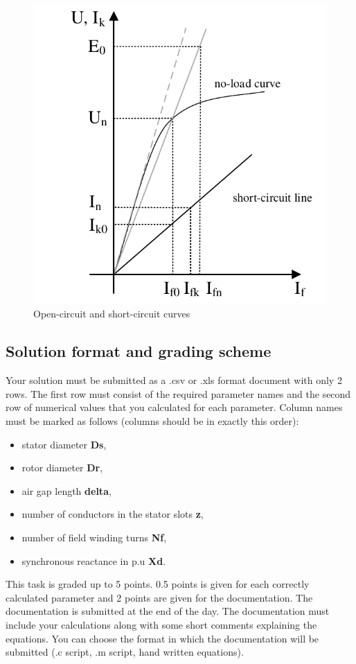 \documentclass[class=article, crop=false]{standalone}
\begin{document}
\begin{figure}[!htb]
			\centering
			\includegraphics[scale=0.5]{NoLoadCurveShortCircuit.pdf}
			\caption{Open-circuit and short-circuit curves}
			\label{fig:02}
\end{figure}

\subsection{Solution format and grading scheme}
Your solution must be submitted as a .csv or .xls format document with only 2 rows. The first row must consist of the required parameter names and the second row of numerical values that you calculated for each parameter. Column names must be marked as follows (columns should be in exactly this order):
\begin{itemize}
    \item stator diameter \textbf{Ds},
    \item rotor diameter \textbf{Dr},
    \item air gap length \textbf{delta},
    \item number of conductors in the stator slots \textbf{z},
    \item number of field winding turns \textbf{Nf},
    \item synchronous reactance in p.u \textbf{Xd}.
\end{itemize}
This task is graded up to 5 points. 0.5 points is given for  each correctly calculated parameter and 2 points are given for the documentation. The documentation is submitted at the end of the day. The documentation must include your calculations along with some short comments explaining the equations. You can choose the format in which the documentation will be submitted (.c script, .m script, hand written equations).
\end{document}
